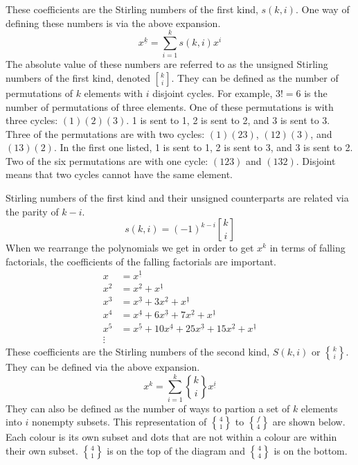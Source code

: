 \documentclass[12pt]{article}
\theoremstyle{definition}
\begin{document}
These coefficients are the Stirling numbers of the first kind, $s(k,i)$. One way of defining these numbers is via the above expansion.
\begin{equation*}
    x^{\underline{k}} = \sum_{i=1}^k s(k, i) x^i
\end{equation*}
The absolute value of these numbers are referred to as the unsigned Stirling numbers of the first kind, denoted $k \brack i$. They can be defined as the number of permutations of $k$ elements with $i$ disjoint cycles. For example, $3! = 6$ is the number of permutations of three elements. One of these permutations is with three cycles: $(1)(2)(3)$. 1 is sent to 1, 2 is sent to 2, and 3 is sent to 3. Three of the permutations are with two cycles: $(1)(23)$, $(12)(3)$, and $(13)(2)$. In the first one listed, 1 is sent to 1, 2 is sent to 3, and 3 is sent to 2. Two of the six permutations are with one cycle: $(123)$ and $(132)$. Disjoint means that two cycles cannot have the same element.

Stirling numbers of the first kind and their unsigned counterparts are related via the parity of $k-i$.
\begin{equation*}
    s(k,i) = (-1)^{k-i} {k\brack i}
\end{equation*}
When we rearrange the polynomials we get in order to get $x^k$ in terms of falling factorials, the coefficients of the falling factorials are important.
\begin{align*}
    x   & = x^{\underline{1}}                                                                                          \\
    x^2 & = x^{\underline{2}} + x^{\underline{1}}                                                                      \\
    x^3 & = x^{\underline{3}} + 3 x^{\underline{2}} + x^{\underline{1}}                                                \\
    x^4 & = x^{\underline{4}} + 6 x^{\underline{3}} + 7 x^{\underline{2}} + x^{\underline{1}}                          \\
    x^5 & = x^{\underline{5}} + 10 x^{\underline{4}} + 25 x^{\underline{3}} + 15 x^{\underline{2}} + x^{\underline{1}} \\
    \vdots
\end{align*}
These coefficients are the Stirling numbers of the second kind, $S(k, i)$ or $k\brace i$. They can be defined via the above expansion.
\begin{equation*}
    x^k = \sum_{i=1}^k {k\brace i} x^{\underline{i}}
\end{equation*}
They can also be defined as the number of ways to partion a set of $k$ elements into $i$ nonempty subsets. This representation of $4\brace 1$ to $f\brace 4$ are shown below. Each colour is its own subset and dots that are not within a colour are within their own subset. $4\brace 1$ is on the top of the diagram and $4\brace 4$ is on the bottom.
\end{document}
